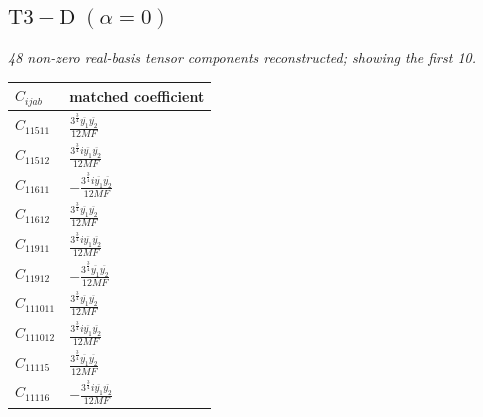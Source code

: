 \documentclass[9pt]{article}
\begin{document}
\subsection*{$ \mathrm{T3-D}\;(\alpha=0) $}
\textit{48 non-zero real-basis tensor components reconstructed; showing the first 10.}
\begin{longtable}{@{}ll@{}}
\toprule
$C_{ijab}$ & matched coefficient \\
\midrule
$C_{11511}$ & $ \frac{3^{\frac{3}{4}} \overline{y_{1}} \overline{y_{2}}}{12 MF} $ \\
$C_{11512}$ & $ \frac{3^{\frac{3}{4}} i \overline{y_{1}} \overline{y_{2}}}{12 MF} $ \\
$C_{11611}$ & $ - \frac{3^{\frac{3}{4}} i \overline{y_{1}} \overline{y_{2}}}{12 MF} $ \\
$C_{11612}$ & $ \frac{3^{\frac{3}{4}} \overline{y_{1}} \overline{y_{2}}}{12 MF} $ \\
$C_{11911}$ & $ \frac{3^{\frac{3}{4}} i \overline{y_{1}} \overline{y_{2}}}{12 MF} $ \\
$C_{11912}$ & $ - \frac{3^{\frac{3}{4}} \overline{y_{1}} \overline{y_{2}}}{12 MF} $ \\
$C_{111011}$ & $ \frac{3^{\frac{3}{4}} \overline{y_{1}} \overline{y_{2}}}{12 MF} $ \\
$C_{111012}$ & $ \frac{3^{\frac{3}{4}} i \overline{y_{1}} \overline{y_{2}}}{12 MF} $ \\
$C_{11115}$ & $ \frac{3^{\frac{3}{4}} \overline{y_{1}} \overline{y_{2}}}{12 MF} $ \\
$C_{11116}$ & $ - \frac{3^{\frac{3}{4}} i \overline{y_{1}} \overline{y_{2}}}{12 MF} $ \\
\bottomrule
\end{longtable}
\end{document}
